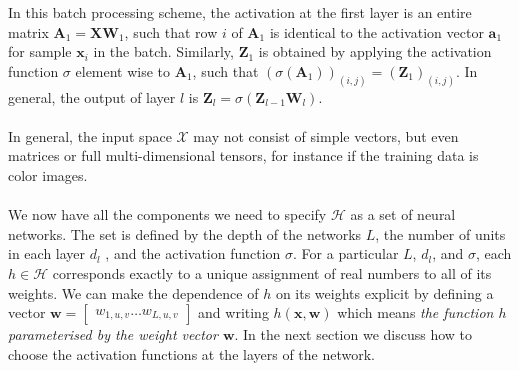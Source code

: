 In this batch processing scheme, the activation at the first layer is an entire matrix $\mathbf{A}_1 = \mathbf{X}\mathbf{W}_1$, such that row $i$ of $\mathbf{A}_1$ is identical to the activation vector $\mathbf{a}_1$ for sample $\mathbf{x}_i$ in the batch. Similarly, $\mathbf{Z}_1$ is obtained by applying the activation function $\sigma$ element wise to $\mathbf{A}_1$, such that $(\sigma(\mathbf{A}_1))_{(i,j)} = (\mathbf{Z}_1)_{(i,j)}$. In general, the output of layer $l$ is $\mathbf{Z}_l = \sigma(\mathbf{Z}_{l-1}\mathbf{W}_l)$.
\\\\
In general, the input space $\mathcal{X}$ may not consist of simple vectors, but even matrices or full multi-dimensional tensors, for instance if the training data is color images.
\\\\
We now have all the components we need to specify $\mathcal{H}$ as a set of neural networks. The set is defined by the depth of the networks $L$, the number of units in each layer $d_l$ , and the activation function $\sigma$.
For a particular $L$, $d_l$, and $\sigma$, each $h \in \mathcal{H}$ corresponds exactly to a unique assignment of real numbers to all of its weights. We can make the dependence of $h$ on its weights explicit by defining a vector $\mathbf{w} = \begin{bmatrix} w_{1,u,v} \dots w_{L,u,v}\end{bmatrix}$ and writing $h(\mathbf{x}, \mathbf{w})$ which means \textit{the function $h$ parameterised by the weight vector $\mathbf{w}$}. In the next section we discuss how to choose the activation functions at the layers of the network.


